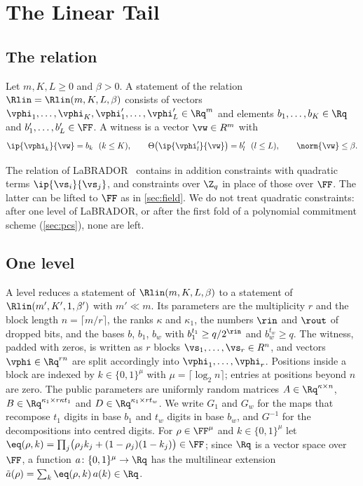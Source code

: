 \section{The Linear Tail}\label{sec:tail}

\subsection{The relation}

\begin{definition}\label{def:rlin}
Let $m,K,L\ge0$ and $\beta>0$. A statement of the relation $\Rlin=\Rlin(m,K,L,\beta)$ consists of vectors $\vphi_1,\dots,\vphi_K,\vphi'_1,\dots,\vphi'_L\in\Rq^m$ and elements $b_1,\dots,b_K\in\Rq$ and $b'_1,\dots,b'_L\in\FF$. A witness is a vector $\vw\in R^m$ with
\[
\ip{\vphi_k}{\vw}=b_k\ \ (k\le K),\qquad\Theta\bigl(\ip{\vphi'_l}{\vw}\bigr)=b'_l\ \ (l\le L),\qquad\norm{\vw}\le\beta .
\]
\end{definition}

The relation of LaBRADOR~\cite{BS23} contains in addition constraints with quadratic terms $\ip{\vs_i}{\vs_j}$, and constraints over $\Z_q$ in place of those over $\FF$. The latter can be lifted to $\FF$ as in \cref{sec:field}. We do not treat quadratic constraints: after one level of LaBRADOR, or after the first fold of a polynomial commitment scheme (\cref{sec:pcs}), none are left.

\subsection{One level}\label{sec:level}

A level reduces a statement of $\Rlin(m,K,L,\beta)$ to a statement of $\Rlin(m',K',1,\beta')$ with $m'\ll m$. Its parameters are the multiplicity $r$ and the block length $n=\lceil m/r\rceil$, the ranks $\kappa$ and $\kappa_1$, the numbers $\rin$ and $\rout$ of dropped bits, and the bases $b$, $b_1$, $b_w$ with $b_1^{t_1}\ge q/2^{\rin}$ and $b_w^{t_w}\ge q$. The witness, padded with zeros, is written as $r$ blocks $\vs_1,\dots,\vs_r\in R^n$, and vectors $\vphi\in\Rq^{rn}$ are split accordingly into $\vphi_1,\dots,\vphi_r$. Positions inside a block are indexed by $k\in\{0,1\}^\mu$ with $\mu=\lceil\log_2n\rceil$; entries at positions beyond $n$ are zero. The public parameters are uniformly random matrices $A\in\Rq^{\kappa\times n}$, $B\in\Rq^{\kappa_1\times r\kappa t_1}$ and $D\in\Rq^{\kappa_1\times rt_w}$. We write $G_1$ and $G_w$ for the maps that recompose $t_1$ digits in base $b_1$ and $t_w$ digits in base $b_w$, and $G^{-1}$ for the decompositions into centred digits. For $\rho\in\FF^\mu$ and $k\in\{0,1\}^\mu$ let $\eq(\rho,k)=\prod_j\bigl(\rho_jk_j+(1-\rho_j)(1-k_j)\bigr)\in\FF$; since $\Rq$ is a vector space over $\FF$, a function $a\colon\{0,1\}^\mu\to\Rq$ has the multilinear extension $\tilde a(\rho)=\sum_k\eq(\rho,k)\,a(k)\in\Rq$.

